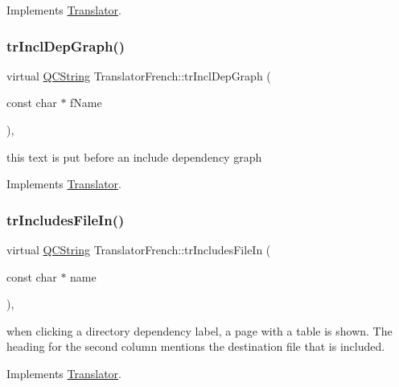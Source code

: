 Implements \mbox{\hyperlink{class_translator}{Translator}}.

\mbox{\label{class_translator_french_a117f807a6768853d4d0f4a656e8b27c8}} 
\subsubsection{\texorpdfstring{trInclDepGraph()}{trInclDepGraph()}}
{\footnotesize\ttfamily virtual \mbox{\hyperlink{class_q_c_string}{Q\+C\+String}} Translator\+French\+::tr\+Incl\+Dep\+Graph (\begin{DoxyParamCaption}\item[{const char $\ast$}]{f\+Name }\end{DoxyParamCaption})\hspace{0.3cm}{\ttfamily [inline]}, {\ttfamily [virtual]}}

this text is put before an include dependency graph 

Implements \mbox{\hyperlink{class_translator}{Translator}}.

\mbox{\label{class_translator_french_a8c4ad01361d6bfabd1a3ec7a54db7094}} 
\subsubsection{\texorpdfstring{trIncludesFileIn()}{trIncludesFileIn()}}
{\footnotesize\ttfamily virtual \mbox{\hyperlink{class_q_c_string}{Q\+C\+String}} Translator\+French\+::tr\+Includes\+File\+In (\begin{DoxyParamCaption}\item[{const char $\ast$}]{name }\end{DoxyParamCaption})\hspace{0.3cm}{\ttfamily [inline]}, {\ttfamily [virtual]}}

when clicking a directory dependency label, a page with a table is shown. The heading for the second column mentions the destination file that is included. 

Implements \mbox{\hyperlink{class_translator}{Translator}}.

\mbox{\label{class_translator_french_ac7dd24c9596cff1459366337ad73d0c8}} 
